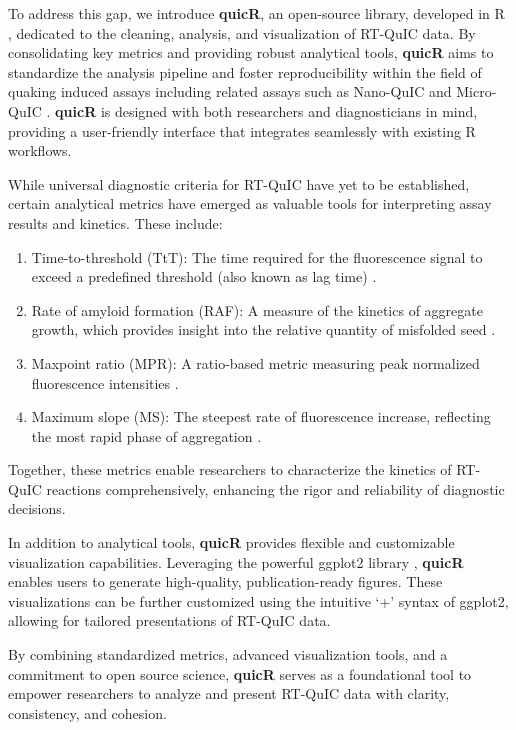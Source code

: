 \documentclass[preprint,12pt,a4paper]{elsarticle}
\begin{document}
        To address this gap, we introduce \textbf{quicR}, an open-source library, developed in R \cite{R2024}, dedicated to the cleaning, analysis, and visualization of RT-QuIC data. By consolidating key metrics and providing robust analytical tools, \textbf{quicR} aims to standardize the analysis pipeline and foster reproducibility within the field of quaking induced assays including related assays such as Nano-QuIC \cite{Christenson2023} and Micro-QuIC \cite{Lee2024}. \textbf{quicR} is designed with both researchers and diagnosticians in mind, providing a user-friendly interface that integrates seamlessly with existing R workflows.

        While universal diagnostic criteria for RT-QuIC have yet to be established, certain analytical metrics have emerged as valuable tools for interpreting assay results and kinetics. These include:

        \begin{enumerate}
            \item Time-to-threshold (TtT): The time required for the fluorescence signal to exceed a predefined threshold (also known as lag time) \cite{Orru2015}. 
            \item Rate of amyloid formation (RAF): A measure of the kinetics of aggregate growth, which provides insight into the relative quantity of misfolded seed \cite{Gallups2022}.
            \item Maxpoint ratio (MPR): A ratio-based metric measuring peak normalized fluorescence intensities \cite{Rowden2023}.
            \item Maximum slope (MS): The steepest rate of fluorescence increase, reflecting the most rapid phase of aggregation \cite{Henderson2015}.
        \end{enumerate}

        Together, these metrics enable researchers to characterize the kinetics of RT-QuIC reactions comprehensively, enhancing the rigor and reliability of diagnostic decisions.

        In addition to analytical tools, \textbf{quicR} provides flexible and customizable visualization capabilities. Leveraging the powerful ggplot2 library \cite{ggplot2016}, \textbf{quicR} enables users to generate high-quality, publication-ready figures. These visualizations can be further customized using the intuitive `+' syntax of ggplot2, allowing for tailored presentations of RT-QuIC data.

        By combining standardized metrics, advanced visualization tools, and a commitment to open source science, \textbf{quicR} serves as a foundational tool to empower researchers to analyze and present RT-QuIC data with clarity, consistency, and cohesion.
\end{document}

